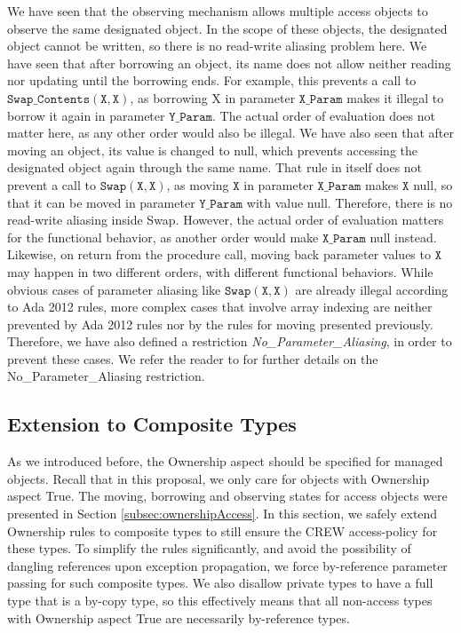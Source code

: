 \documentclass{llncs}
\newcommand\var[1]{\ensuremath{\mathtt{#1}}}
\begin{document}
We have seen that the observing mechanism allows multiple access objects to observe the same designated object. In the scope of these objects, the designated object
cannot be written, so there is no read-write aliasing problem here.
We have seen that after borrowing an object, its name does not allow neither reading nor updating until the borrowing ends. For example, this prevents a call to \var{Swap\_Contents (X, X)},
as borrowing X in parameter \var{X\_Param} makes it illegal to borrow it again in parameter \var{Y\_Param}. The actual order of evaluation does not matter here, as any other order would also be illegal.
We have also seen that after moving an object, its value is changed to null, which prevents accessing the designated object again through the same name.
That rule in itself does not prevent a call to \var{Swap(X, X)}, as moving \var{X} in parameter \var{X\_Param} makes \var{X} null, so that it can be moved in parameter \var{Y\_Param} with value null.
Therefore, there is no read-write aliasing inside Swap. However, the actual order of evaluation matters for the functional behavior, as another order would make \var{X\_Param} null
instead. Likewise, on return from the procedure call, moving back parameter values to \var{X} may happen in two different orders, with different functional behaviors.
While obvious cases of parameter aliasing like \var{Swap(X,X)} are already illegal according to Ada 2012 rules, more complex cases that involve array indexing are neither
prevented by Ada 2012 rules nor by the rules for moving presented previously. Therefore, we have also defined a restriction \textit{No\_Parameter\_Aliasing},
in order to prevent these cases. We refer the reader to \cite{AI2017} for further details on the No\_Parameter\_Aliasing restriction.


\subsection{Extension to Composite Types} 
\label{subsec:ownershipComposite}

As we introduced before, the Ownership aspect should be specified for managed objects. Recall that in this proposal, we only care for objects with Ownership aspect True.
The moving, borrowing and observing states for access objects were presented in Section \ref{subsec:ownershipAccess}. In this section, we safely extend Ownership rules to
composite types to still ensure the CREW access-policy for these types. To simplify the rules significantly, and avoid the possibility of dangling references upon exception
propagation, we force by-reference parameter passing for such composite types.  We also disallow private types to have a full type that is a by-copy type, so this effectively
means that all non-access types with Ownership aspect True are necessarily by-reference types. 
\end{document}
